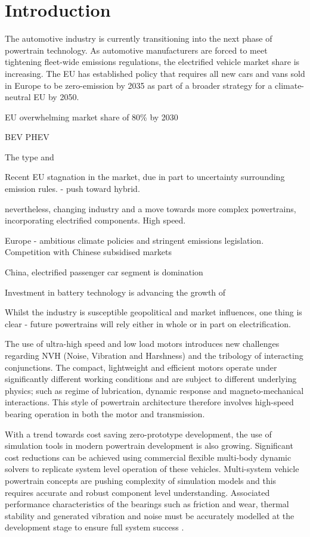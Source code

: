 \chapter{Introduction}
\label{Introduction}

The automotive industry is currently transitioning into the next phase of powertrain technology. As automotive manufacturers are forced to meet tightening fleet-wide emissions regulations, the electrified vehicle market share is increasing. The EU has established policy \cite{EUL110/5} that requires all new cars and vans sold in Europe to be zero-emission by 2035 as part of a broader strategy for a climate-neutral EU by 2050.

EU overwhelming market share of 80\% by 2030 

BEV PHEV 

The type and 

Recent EU stagnation in the market, due in part to uncertainty surrounding emission rules. - push toward hybrid.

nevertheless, changing industry and a move towards more complex powertrains, incorporating electrified components. High speed. 

Europe - ambitious climate policies and stringent emissions legislation. Competition with Chinese subsidised markets

China, electrified passenger car segment is domination 

Investment in battery technology is advancing the growth of 

Whilst the industry is susceptible geopolitical and market influences, one thing is clear - future powertrains will rely either in whole or in part on electrification.


The use of ultra-high speed and low load motors introduces new challenges regarding NVH (Noise, Vibration and Harshness) and the tribology of interacting conjunctions. The compact, lightweight and efficient motors operate under significantly different working conditions and are subject to different underlying physics; such as regime of lubrication, dynamic response and magneto-mechanical interactions. This style of powertrain architecture therefore involves high-speed bearing operation in both the motor and transmission.

With a trend towards cost saving zero-prototype development, the use of simulation tools in modern powertrain development is also growing. Significant cost reductions can be achieved using commercial flexible multi-body dynamic solvers to replicate system level operation of these vehicles. Multi-system vehicle powertrain concepts are pushing complexity of simulation models and this requires accurate and robust component level understanding. Associated performance characteristics of the bearings such as friction and wear, thermal stability and generated vibration and noise must be accurately modelled at the development stage to ensure full system success \cite{Wensing1972a}. 


